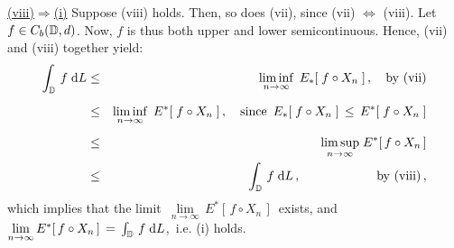 \vskip 0.5cm \noindent
\underline{(viii)\;$\Longrightarrow$\;(i)}
\vskip 0.2cm \noindent
Suppose (viii) holds. Then, so does (vii), since (vii) $\Longleftrightarrow$ (viii).
Let $f \in C_{b}(\mathbb{D},d)$. Now, $f$ is thus both upper and lower semicontinuous.
Hence, (vii) and (viii) together yield:
\begin{eqnarray*}
\int_{\D}\, f \;\d L
& \leq &
	\underset{n\rightarrow\infty}{\liminf}\;\,E_{*}\!\left[\;f \circ X_{n}\;\right],
	\quad\textnormal{by (vii)}
\\
& \overset{{\color{white}+}}{\leq} &
	\underset{n\rightarrow\infty}{\liminf}\;\,E^{*}\!\left[\;f \circ X_{n}\;\right],
	\quad\textnormal{since \,$E_{*}\!\left[\;f \circ X_{n}\;\right] \,\leq\, E^{*}\!\left[\;f \circ X_{n}\;\right]$}
\\
& \overset{{\color{white}+}}{\leq} &
	\underset{n\rightarrow\infty}{\limsup}\; E^{*}\!\left[\,f \circ X_{n}\,\right] 
\\
& \leq &
	\int_{\D}\, f \;\d L\,,
	\quad\quad\quad\quad\quad\quad\textnormal{by (viii)}\,,
\end{eqnarray*}
which implies that the limit
\,$\underset{n\rightarrow\infty}{\lim}\, E^{*}\!\left[\,f \circ X_{n}\,\right]$\,
exists, and
\,$\underset{n\rightarrow\infty}{\lim}\, E^{*}\!\left[\,f \circ X_{n}\,\right] \,=\, \int_{\mathbb{D}}\, f \;\textnormal{d} L$,\,
i.e. (i) holds.

